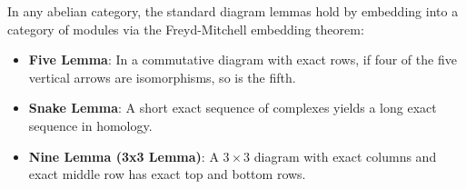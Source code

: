 In any abelian category, the standard diagram lemmas hold by embedding into a category of modules via the Freyd-Mitchell embedding theorem:
\begin{itemize}
\item \textbf{Five Lemma}: In a commutative diagram with exact rows, if four of the five vertical arrows are isomorphisms, so is the fifth.
\item \textbf{Snake Lemma}: A short exact sequence of complexes yields a long exact sequence in homology.
\item \textbf{Nine Lemma (3x3 Lemma)}: A $3 \times 3$ diagram with exact columns and exact middle row has exact top and bottom rows.
\end{itemize}